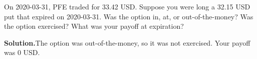 \noindent On 2020-03-31, PFE traded for 33.42 USD. Suppose you were long a 32.15 USD put that expired on 2020-03-31. Was the option in, at, or out-of-the-money? Was the option exercised? What was your payoff at expiration?

\vspace{9pt} 

\textbf{Solution.}The option was out-of-the-money, so it was not exercised. Your payoff was 0 USD.